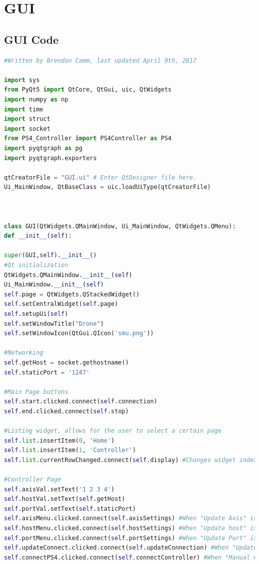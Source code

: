 \section{GUI}
\label{appendix:GUI}
\subsection{GUI Code}
\label{appendix:GUICode}
\lstset{basicstyle=\tiny}
\begin{lstlisting}[language=Python,caption={GUI.py},label={lst:GUI.py}]
#Written by Brendon Camm, last updated April 9th, 2017

import sys
from PyQt5 import QtCore, QtGui, uic, QtWidgets
import numpy as np
import time
import struct
import socket
from PS4_Controller import PS4Controller as PS4
import pyqtgraph as pg
import pyqtgraph.exporters

qtCreatorFile = "GUI.ui" # Enter QtDesigner file here.
Ui_MainWindow, QtBaseClass = uic.loadUiType(qtCreatorFile)



class GUI(QtWidgets.QMainWindow, Ui_MainWindow, QtWidgets.QMenu):   
def __init__(self):

super(GUI,self).__init__()
#Qt initialization
QtWidgets.QMainWindow.__init__(self)
Ui_MainWindow.__init__(self)
self.page = QtWidgets.QStackedWidget()
self.setCentralWidget(self.page)
self.setupUi(self)
self.setWindowTitle("Drone")
self.setWindowIcon(QtGui.QIcon('smu.png'))

#Networking
self.getHost = socket.gethostname()
self.staticPort = '1247'

#Main Page buttons
self.start.clicked.connect(self.connection)
self.end.clicked.connect(self.stop)

#Listing widget, allows for the user to select a certain page
self.list.insertItem(0, 'Home')
self.list.insertItem(1, 'Controller')
self.list.currentRowChanged.connect(self.display) #Changes widget index to appropriate page

#Controller Page
self.axisVal.setText('1 2 3 4')
self.hostVal.setText(self.getHost)
self.portVal.setText(self.staticPort)
self.axisMenu.clicked.connect(self.axisSettings) #When "Update Axis" is clicked call definition axisSettings
self.hostMenu.clicked.connect(self.hostSettings) #When "Update host" is clicked call definition hostSettings
self.portMenu.clicked.connect(self.portSettings) #When "Update Port" is clicked call definition portSettings
self.updateConnect.clicked.connect(self.updateConnection) #When "Update Connection" is clicked call definition updateConnection
self.connectPS4.clicked.connect(self.connectController) #When "Manual Control" is clicked call definition connectController


\end{lstlisting}

